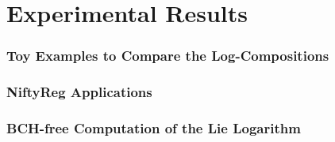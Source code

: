 
\chapter{Experimental Results}\label{ch:results}

\subsection{Toy Examples to Compare the Log-Compositions}

\subsection{NiftyReg Applications}

\subsection{BCH-free Computation of the Lie Logarithm }
